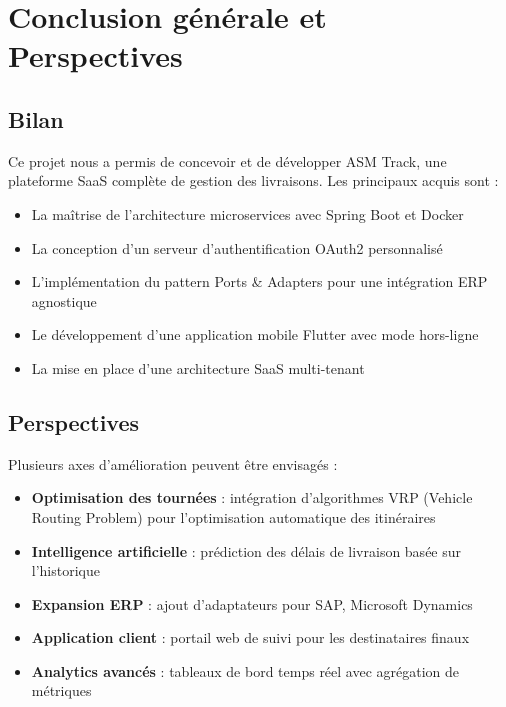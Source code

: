 \chapter*{Conclusion générale et Perspectives}

\section*{Bilan}

Ce projet nous a permis de concevoir et de développer ASM Track, une plateforme SaaS complète de gestion des livraisons. Les principaux acquis sont :

\begin{itemize}
  \item La maîtrise de l'architecture microservices avec Spring Boot et Docker
  \item La conception d'un serveur d'authentification OAuth2 personnalisé
  \item L'implémentation du pattern Ports \& Adapters pour une intégration ERP agnostique
  \item Le développement d'une application mobile Flutter avec mode hors-ligne
  \item La mise en place d'une architecture SaaS multi-tenant
\end{itemize}

\section*{Perspectives}

Plusieurs axes d'amélioration peuvent être envisagés :

\begin{itemize}
  \item \textbf{Optimisation des tournées} : intégration d'algorithmes VRP (Vehicle Routing Problem) pour l'optimisation automatique des itinéraires
  \item \textbf{Intelligence artificielle} : prédiction des délais de livraison basée sur l'historique
  \item \textbf{Expansion ERP} : ajout d'adaptateurs pour SAP, Microsoft Dynamics
  \item \textbf{Application client} : portail web de suivi pour les destinataires finaux
  \item \textbf{Analytics avancés} : tableaux de bord temps réel avec agrégation de métriques
\end{itemize}
